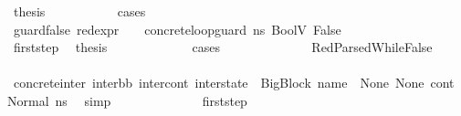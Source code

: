 \begin{isabellebody}
\ {\isacharquery}{\kern0pt}thesis\ \isanewline
\ \ \ \ \ \ \ \ \isamarkupfalse%
\ cases\isanewline
\ \ \ \ \ \ \ \ \ \ \isamarkupfalse%
\ guard{\isacharunderscore}{\kern0pt}false{\isacharcolon}{\kern0pt}\ {\isachardoublequoteopen}{\isacharparenleft}{\kern0pt}red{\isacharunderscore}{\kern0pt}expr\ {\isasymLambda}\ {\isasymGamma}\ {\isasymOmega}\ concrete{\isacharunderscore}{\kern0pt}loop{\isacharunderscore}{\kern0pt}guard\ ns{}\ {\isacharparenleft}{\kern0pt}BoolV\ False{\isacharparenright}{\kern0pt}{\isacharparenright}{\kern0pt}{\isachardoublequoteclose}\isanewline
\isanewline
\ \ \ \ \ \ \ \ \ \ \isamarkupfalse%
\ first{\isacharunderscore}{\kern0pt}step\ \isamarkupfalse%
\ {\isacharquery}{\kern0pt}thesis\ \isanewline
\ \ \ \ \ \ \ \ \ \ \isamarkupfalse%
\ cases\isanewline
\ \ \ \ \ \ \ \ \ \ \ \ \isamarkupfalse%
\ RedParsedWhileFalse\isanewline
\ \ \ \ \ \ \ \ \ \ \ \ \isamarkupfalse%
\ concrete{\isacharunderscore}{\kern0pt}inter{}{\isacharcolon}{\kern0pt}\ {\isachardoublequoteopen}{\isacharparenleft}{\kern0pt}inter{\isacharunderscore}{\kern0pt}bb{\isacharcomma}{\kern0pt}\ inter{\isacharunderscore}{\kern0pt}cont{\isacharcomma}{\kern0pt}\ inter{\isacharunderscore}{\kern0pt}state{\isacharparenright}{\kern0pt}\ {\isacharequal}{\kern0pt}\ {\isacharparenleft}{\kern0pt}{\isacharparenleft}{\kern0pt}BigBlock\ name\ {\isacharbrackleft}{\kern0pt}{\isacharbrackright}{\kern0pt}\ None\ None{\isacharparenright}{\kern0pt}{\isacharcomma}{\kern0pt}\ cont{}{\isacharcomma}{\kern0pt}\ {\isacharparenleft}{\kern0pt}Normal\ ns{}{\isacharparenright}{\kern0pt}{\isacharparenright}{\kern0pt}{\isachardoublequoteclose}\ \isamarkupfalse%
\ simp\isanewline
\isanewline
\ \ \ \ \ \ \ \ \ \ \ \ \isamarkupfalse%
\ first{\isacharunderscore}{\kern0pt}step\isanewline
\ \ \ \ \ \ \ \ \ \ \ \ \isamarkupfalse%

\end{isabellebody}
